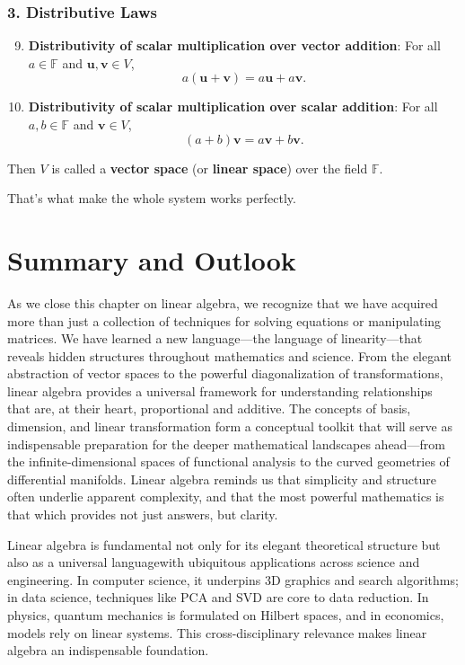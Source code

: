 \subsubsection*{3. Distributive Laws}
\begin{enumerate}
    \setcounter{enumi}{8}
    \item \textbf{Distributivity of scalar multiplication over vector addition}: For all $a \in \mathbb{F}$ and $\mathbf{u}, \mathbf{v} \in V$,
    \[
    a (\mathbf{u} + \mathbf{v}) = a \mathbf{u} + a \mathbf{v}.
    \]
    \item \textbf{Distributivity of scalar multiplication over scalar addition}: For all $a, b \in \mathbb{F}$ and $\mathbf{v} \in V$,
    \[
    (a + b) \mathbf{v} = a \mathbf{v} + b \mathbf{v}.
    \]
\end{enumerate}

Then $V$ is called a \textbf{vector space} (or \textbf{linear space}) over the field $\mathbb{F}$.

That's what make the whole system works perfectly.

\section{Summary and Outlook}

As we close this chapter on linear algebra, we recognize that we have acquired more than just a collection of techniques for solving equations or manipulating matrices. We have learned a new language—the language of linearity—that reveals hidden structures throughout mathematics and science. From the elegant abstraction of vector spaces to the powerful diagonalization of transformations, linear algebra provides a universal framework for understanding relationships that are, at their heart, proportional and additive. The concepts of basis, dimension, and linear transformation form a conceptual toolkit that will serve as indispensable preparation for the deeper mathematical landscapes ahead—from the infinite-dimensional spaces of functional analysis to the curved geometries of differential manifolds. Linear algebra reminds us that simplicity and structure often underlie apparent complexity, and that the most powerful mathematics is that which provides not just answers, but clarity.

Linear algebra is fundamental not only for its elegant theoretical structure but also as a universal languagewith ubiquitous applications across science and engineering. In computer science, it underpins 3D graphics and search algorithms; in data science, techniques like PCA and SVD are core to data reduction. In physics, quantum mechanics is formulated on Hilbert spaces, and in economics, models rely on linear systems. This cross-disciplinary relevance makes linear algebra an indispensable foundation.

